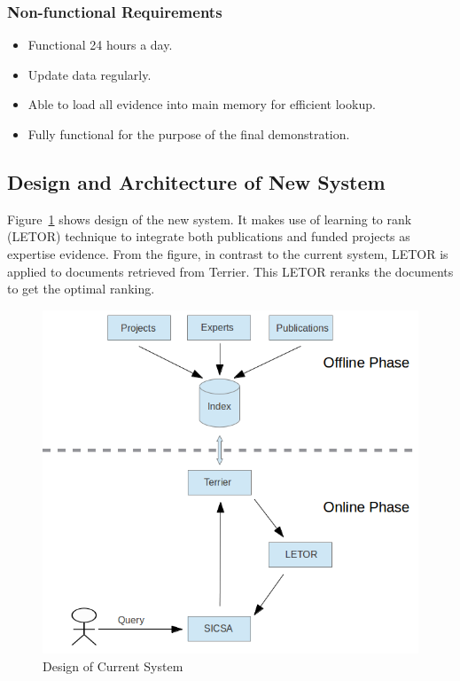 \subsubsection{Non-functional Requirements}
\begin{itemize}
 \item Functional 24 hours a day.
 \item Update data regularly.
 \item Able to load all evidence into main memory for efficient lookup.
 \item Fully functional for the purpose of the final demonstration.
\end{itemize}

\subsection{Design and Architecture of New System} \label{section:union}
Figure~\ref{fig:newDesign} shows design of the new system. It makes use of learning to rank (LETOR) technique to integrate 
both publications and funded projects as expertise evidence. From the figure, in contrast to the current system, 
LETOR is applied to documents retrieved from Terrier. This LETOR reranks the documents to get the optimal ranking.

 \begin{figure}
 \centering
 \includegraphics[scale=0.4,keepaspectratio]{./figures/newSystemDesign.png}
 \caption{Design of Current System} \label{fig:newDesign} 
\end{figure}

